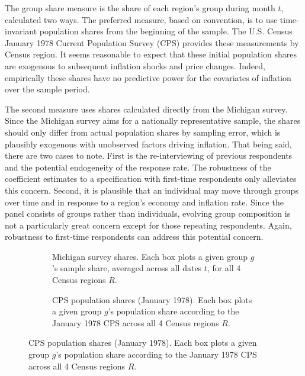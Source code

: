 \documentclass[12pt]{article}
\begin{document}
The group share measure is the share of each region's group during month $t$, calculated two ways. The preferred measure, based on convention, is to use time-invariant population shares from the beginning of the sample. The U.S. Census January 1978 Current Population Survey (CPS) provides these measurements by Census region. It seems reasonable to expect that these initial population shares are exogenous to subsequent inflation shocks and price changes. Indeed, empirically these shares have no predictive power for the covariates of inflation over the sample period.  

The second measure uses shares calculated directly from the Michigan survey. Since the Michigan survey aims for a nationally representative sample, the shares should only differ from actual population shares by sampling error, which is plausibly exogenous with unobserved factors driving inflation. That being said, there are two cases to note. First is the re-interviewing of previous respondents and the potential endogeneity of the response rate. The robustness of the coefficient estimates to a specification with first-time respondents only alleviates this concern. Second, it is plausible that an individual may move through groups over time and in response to a region's economy and inflation rate. Since the panel consists of groups rather than individuals, evolving group composition is not a particularly great concern except for those repeating respondents. Again, robustness to first-time respondents can address this potential concern.

\begin{figure}
\centering
\caption{Calculated group shares.}\label{fig:shares}
\begin{subfigure}[t]{\textwidth}
\centering

\caption{Michigan survey shares. Each box plots a given group $g$'s sample share, averaged across all dates $t$, for all 4 Census regions $R$.}\label{subfig:shares:group}
\end{subfigure}
\quad
\begin{subfigure}[t]{\textwidth}
\centering

\caption{CPS population shares (January 1978). Each box plots a given group $g$'s population share according to the January 1978 CPS across all 4 Census regions $R$.}\label{subfig:shares:cps}
\end{subfigure}
\end{figure}
\end{document}
